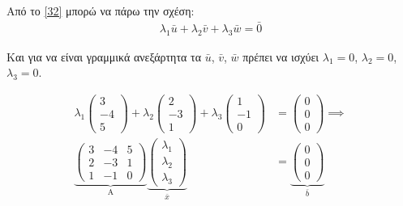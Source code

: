 \documentclass[12pt, fleqn, leqno]{extreport}
\begin{document}
Από το \eqref{32} μπορώ να πάρω την σχέση:
\begin{equation}%
    \begin{aligned}
        \lambda_{1}\bar{u} + \lambda_{2}\bar{v} + \lambda_{3}\bar{w} = \bar{0}
    \end{aligned}\label{33}
\end{equation}

Και για  να είναι γραμμικά ανεξάρτητα τα $\bar{u}$, $\bar{v}$, $\bar{w}$ πρέπει να ισχύει $\lambda_{1}=0$, $\lambda_{2}=0$, $\lambda_{3}=0$.

\begin{equation}%
    \begin{aligned}
        \lambda_{1}\begin{pmatrix}
            3 \\ -4 \\ 5
        \end{pmatrix} +
        \lambda_{2}\begin{pmatrix}
            2 \\ -3 \\ 1
        \end{pmatrix} +
        \lambda_{3}\begin{pmatrix}
            1 \\ -1 \\ 0
        \end{pmatrix}        & =
        \begin{pmatrix}
            0 \\ 0 \\ 0
        \end{pmatrix}
        \implies                                         \\
        \underbrace{
            \begin{pmatrix}
                3 & -4 & 5 \\
                2 & -3 & 1 \\
                1 & -1 & 0
            \end{pmatrix}}_\text{A}
        \underbrace{
        \begin{pmatrix}
                \lambda_{1} \\
                \lambda_{2} \\
                \lambda_{3}
            \end{pmatrix}}_\text{$\bar{x}$} & =
        \underbrace{
            \begin{pmatrix}
                0 \\
                0 \\
                0
            \end{pmatrix}}_\text{$\bar{b}$}
    \end{aligned}\label{34}
\end{equation}
\end{document}

